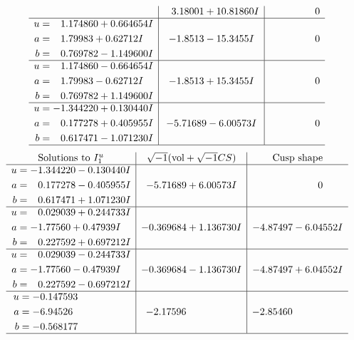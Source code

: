 \documentclass[1p]{elsarticle_modified}
\theoremstyle{definition}
\newcommand{\I}{\sqrt{-1}}
\begin{document}
$$\begin{array}{c|c|c}
 & \phantom{-}3.18001 + 10.81860 I & \phantom{-0.000000 } 0 \\ \hline\begin{aligned}
u &= \phantom{-}1.174860 + 0.664654 I \\
a &= \phantom{-}1.79983 + 0.62712 I \\
b &= \phantom{-}0.769782 - 1.149600 I\end{aligned}
 & -1.8513 - 15.3455 I & \phantom{-0.000000 } 0 \\ \hline\begin{aligned}
u &= \phantom{-}1.174860 - 0.664654 I \\
a &= \phantom{-}1.79983 - 0.62712 I \\
b &= \phantom{-}0.769782 + 1.149600 I\end{aligned}
 & -1.8513 + 15.3455 I & \phantom{-0.000000 } 0 \\ \hline\begin{aligned}
u &= -1.344220 + 0.130440 I \\
a &= \phantom{-}0.177278 + 0.405955 I \\
b &= \phantom{-}0.617471 - 1.071230 I\end{aligned}
 & -5.71689 - 6.00573 I & \phantom{-0.000000 } 0\\
 \hline 
 \end{array}$$\newpage$$\begin{array}{c|c|c}  
\text{Solutions to }I^u_{1}& \I (\text{vol} + \sqrt{-1}CS) & \text{Cusp shape}\\
 \hline 
\begin{aligned}
u &= -1.344220 - 0.130440 I \\
a &= \phantom{-}0.177278 - 0.405955 I \\
b &= \phantom{-}0.617471 + 1.071230 I\end{aligned}
 & -5.71689 + 6.00573 I & \phantom{-0.000000 } 0 \\ \hline\begin{aligned}
u &= \phantom{-}0.029039 + 0.244733 I \\
a &= -1.77560 + 0.47939 I \\
b &= \phantom{-}0.227592 + 0.697212 I\end{aligned}
 & -0.369684 + 1.136730 I & -4.87497 - 6.04552 I \\ \hline\begin{aligned}
u &= \phantom{-}0.029039 - 0.244733 I \\
a &= -1.77560 - 0.47939 I \\
b &= \phantom{-}0.227592 - 0.697212 I\end{aligned}
 & -0.369684 - 1.136730 I & -4.87497 + 6.04552 I \\ \hline\begin{aligned}
u &= -0.147593\phantom{ +0.000000I} \\
a &= -6.94526\phantom{ +0.000000I} \\
b &= -0.568177\phantom{ +0.000000I}\end{aligned}
 & -2.17596\phantom{ +0.000000I} & -2.85460\phantom{ +0.000000I}\\
 \hline 
 \end{array}$$\newpage\newpage\renewcommand{\arraystretch}{1}
\end{document}
